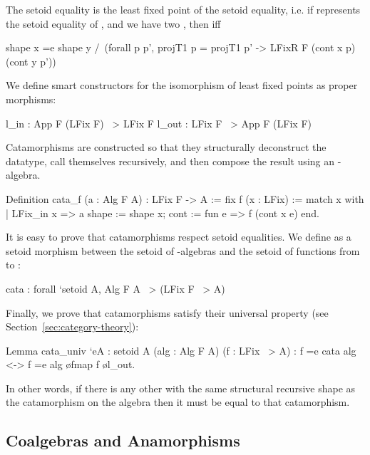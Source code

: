 \documentclass[a4paper,UKenglish,cleveref, autoref, thm-restate]{lipics-v2021}
\begin{document}
The  setoid equality is the least fixed point of the 
setoid equality, i.e. if  represents the setoid equality of
, and we have two , then  iff
\begin{coqcode}
shape x =e shape y /\ (forall p p', projT1 p = projT1 p'
   -> LFixR F (cont x p) (cont y p'))
\end{coqcode}
We define smart constructors for the isomorphism of least fixed
points as proper morphisms:
\begin{coqcode}
l_in : App F (LFix F) ~> LFix F         l_out : LFix F ~> App F (LFix F)
\end{coqcode}
Catamorphisms are constructed so that they structurally deconstruct the
datatype, call themselves recursively, and then compose the result using an
-algebra.
\begin{coqcode}
Definition cata_f (a : Alg F A) : LFix F -> A
  := fix f (x : LFix) := match x with
        | LFix_in x => a {shape := shape x; cont := fun e => f (cont x e)}
        end.
\end{coqcode}
It is easy to prove that catamorphisms respect setoid equalities.  We
define  as a setoid morphism between the setoid of -algebras and the
setoid of functions from  to :
\begin{coqcode}
cata : forall `{setoid A}, Alg F A ~> (LFix F ~> A)
\end{coqcode}
Finally, we prove that catamorphisms satisfy their universal property (see
Section~\ref{sec:category-theory}):
\begin{coqcode}
Lemma cata_univ `{eA : setoid A} (alg : Alg F A) (f : LFix ~> A)
    : f =e cata alg <-> f =e alg \o fmap f \o l_out.
\end{coqcode}
In other words, if there is any other  with the same structural recursive
shape as the catamorphism on the algebra  then it must be equal to that
catamorphism.

\subsection{Coalgebras and Anamorphisms}
\label{sec:coq-coalg}
\end{document}
